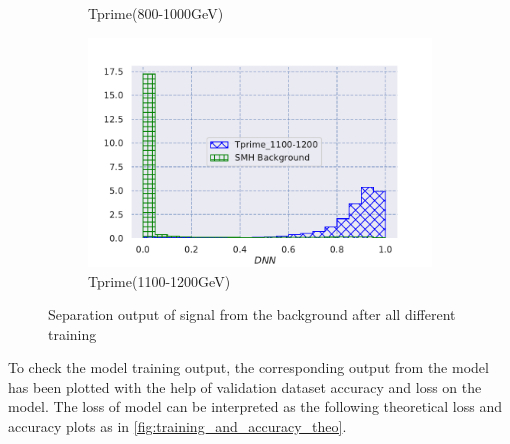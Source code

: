 \begin{figure}[H]
\begin{subfigure}[b]{0.47\textwidth}
         \caption{Tprime(800-1000GeV)}
         \label{fig:three sin x}
     \end{subfigure}
     \hfill
     \begin{subfigure}[b]{0.47\textwidth}
         \centering
         \includegraphics[width=\textwidth]{figure_4/Training_with_Tprime_1100-1200GeV_ with_backgrounds.pdf}
         \caption{Tprime(1100-1200GeV)}
         \label{fig:five over x}
     \end{subfigure}
        \caption{Separation output of signal from the background after all different training }
        \label{fig:output_training_models}
\end{figure}


To check the model training output, the corresponding output from the model has been plotted with the help of validation dataset accuracy and loss on the model. The loss of model can be interpreted as the following theoretical loss and accuracy plots as in \autoref{fig:training_and_accuracy_theo}.

